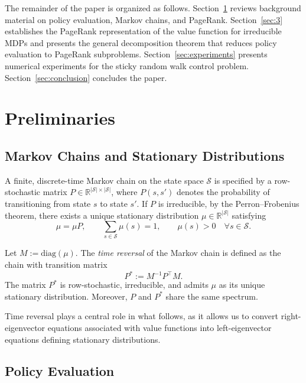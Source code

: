 \documentclass[letterpaper, 10 pt, conference]{ieeeconf}
\begin{document}
The remainder of the paper is organized as follows.
Section~\ref{sec:2} reviews background material on policy evaluation, Markov
chains, and PageRank.
Section~\ref{sec:3} establishes the PageRank representation of the value function
for irreducible MDPs and presents the general decomposition theorem that
reduces policy evaluation to PageRank subproblems.
Section~\ref{sec:experiments} presents numerical experiments for the sticky random walk control problem.
Section~\ref{sec:conclusion} concludes the paper.

\section{Preliminaries}
\label{sec:2}

\subsection{Markov Chains and Stationary Distributions}

A finite, discrete-time Markov chain on the state space $\mathcal{S}$ is specified
by a row-stochastic matrix $P\in\mathbb{R}^{|\mathcal{S}|\times|\mathcal{S}|}$,
where $P(s,s')$ denotes the probability of transitioning from state $s$ to state
$s'$. 
If $P$ is irreducible, by the Perron–Frobenius theorem, there exists a unique stationary distribution
$\mu\in\mathbb{R}^{|\mathcal{S}|}$ satisfying
$$
\mu = \mu P,
\qquad
\sum_{s\in\mathcal{S}} \mu(s) = 1,
\qquad
\mu(s) > 0 \quad \forall s\in\mathcal{S}.
$$

Let $M := \mathrm{diag}(\mu)$.
The \emph{time reversal} of the Markov chain is defined as the chain with
transition matrix
\begin{equation}
\label{eq:time_reversal}
P^* := M^{-1} P^\top M .
\end{equation}
The matrix $P^*$ is row-stochastic, irreducible, and admits $\mu$ as its unique
stationary distribution.
Moreover, $P$ and $P^*$ share the same spectrum.

Time reversal plays a central role in what follows, as it allows us to convert
right-eigenvector equations associated with value functions into left-eigenvector
equations defining stationary distributions.

\subsection{Policy Evaluation}
\end{document}
